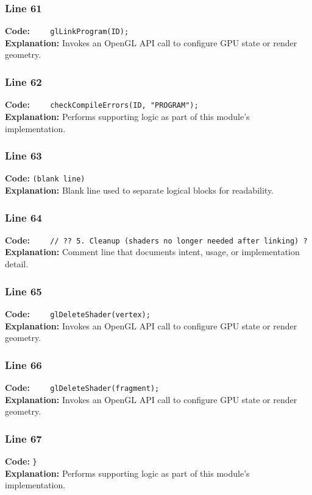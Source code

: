 \documentclass[11pt,a4paper]{article}
\begin{document}
\subsubsection*{Line 61}
\textbf{Code:} \verb|    glLinkProgram(ID);|\\
\textbf{Explanation:} Invokes an OpenGL API call to configure GPU state or render geometry.

\subsubsection*{Line 62}
\textbf{Code:} \verb|    checkCompileErrors(ID, "PROGRAM");|\\
\textbf{Explanation:} Performs supporting logic as part of this module's implementation.

\subsubsection*{Line 63}
\textbf{Code:} \texttt{(blank line)}\\
\textbf{Explanation:} Blank line used to separate logical blocks for readability.

\subsubsection*{Line 64}
\textbf{Code:} \verb|    // ?? 5. Cleanup (shaders no longer needed after linking) ?|\\
\textbf{Explanation:} Comment line that documents intent, usage, or implementation detail.

\subsubsection*{Line 65}
\textbf{Code:} \verb|    glDeleteShader(vertex);|\\
\textbf{Explanation:} Invokes an OpenGL API call to configure GPU state or render geometry.

\subsubsection*{Line 66}
\textbf{Code:} \verb|    glDeleteShader(fragment);|\\
\textbf{Explanation:} Invokes an OpenGL API call to configure GPU state or render geometry.

\subsubsection*{Line 67}
\textbf{Code:} \verb|}|\\
\textbf{Explanation:} Performs supporting logic as part of this module's implementation.
\end{document}
